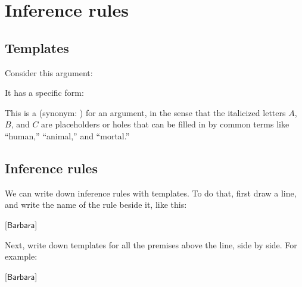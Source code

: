 \documentclass[../../../main.tex]{subfiles}
\begin{document}
\chapter{Inference rules}


\section{Templates}

Consider this argument:

\begin{prooftree*}
\end{prooftree*}

\noindent
It has a specific form:

\begin{prooftree*}
\end{prooftree*}

\noindent
This is a  (synonym: ) for an argument, in the sense that the italicized letters $A$, $B$, and $C$ are placeholders or holes that can be filled in by common terms like ``human,'' ``animal,'' and ``mortal.''


\section{Inference rules}

We can write down inference rules with templates. To do that, first draw a line, and write the name of the rule beside it, like this:

\begin{prooftree*}
  \hypo{~~~~~~~~~~~~~~~~~~~~~~~~~~~~~~}
  [$\mathsf{Barbara}$]{}
\end{prooftree*}

\noindent
Next, write down templates for all the premises above the line, side by side. For example:

\begin{prooftree*}
  [$\mathsf{Barbara}$]{}
\end{prooftree*}
\end{document}
